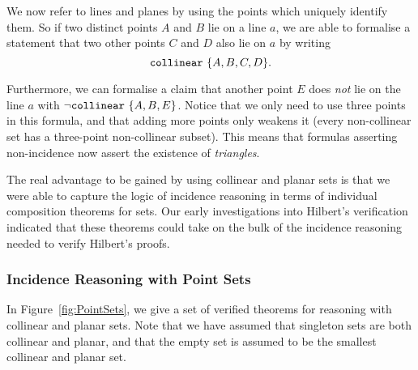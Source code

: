 
We now refer to lines and planes by using the points which uniquely identify them. So if two distinct points $A$ and $B$ lie on a line $a$, we are able to formalise a statement that two other points $C$ and $D$ also lie on $a$ by writing
\begin{displaymath}
\texttt{collinear}\ \{A, B, C, D\}.
\end{displaymath}

Furthermore, we can formalise a claim that another point $E$ does \emph{not} lie on the line $a$ with $\neg \texttt{collinear}\ \{A, B, E\}$. Notice that we only need to use three points in this formula, and that adding more points only weakens it (every non-collinear set has a three-point non-collinear subset). This means that formulas asserting non-incidence now assert the existence of \emph{triangles}.

The real advantage to be gained by using collinear and planar sets is that we were able to capture the logic of incidence reasoning in terms of individual composition theorems for sets. Our early investigations into Hilbert's verification~\cite{ScottMScThesis} indicated that these theorems could take on the bulk of the incidence reasoning needed to verify Hilbert's proofs.

\subsubsection{Incidence Reasoning with Point Sets}\label{sec:PointSets}
In Figure~\ref{fig:PointSets}, we give a set of verified theorems for reasoning with collinear and planar sets. Note that we have assumed that singleton sets are both collinear and planar, and that the empty set is assumed to be the smallest collinear and planar set.


